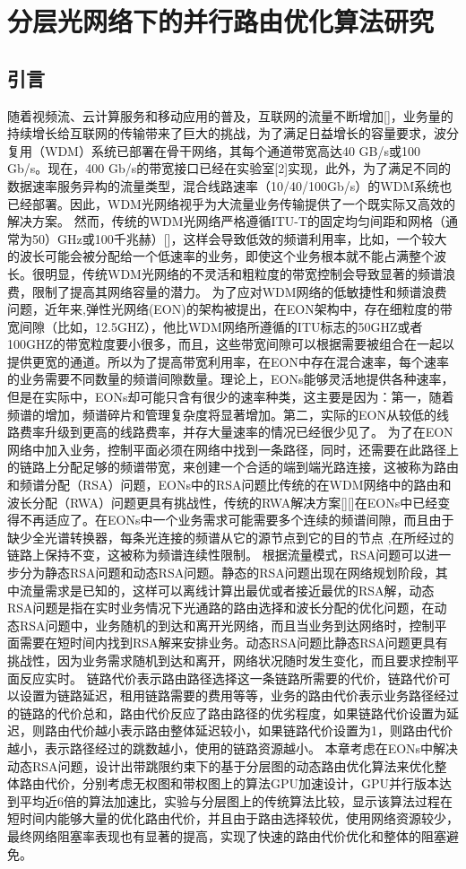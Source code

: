 
\chapter{分层光网络下的并行路由优化算法研究}
\section{引言}
  随着视频流、云计算服务和移动应用的普及，互联网的流量不断增加[]，业务量的持续增长给互联网的传输带来了巨大的挑战，为了满足日益增长的容量要求，波分复用（WDM）系统已部署在骨干网络，其每个通道带宽高达40 GB/s或100 Gb/s。现在，400 Gb/s的带宽接口已经在实验室[2]实现，此外，为了满足不同的数据速率服务异构的流量类型，混合线路速率（10/40/100Gb/s）的WDM系统也已经部署。因此，WDM光网络视乎为大流量业务传输提供了一个既实际又高效的解决方案。
  然而，传统的WDM光网络严格遵循ITU-T的固定均匀间距和网格（通常为50）GHz或100千兆赫）[]，这样会导致低效的频谱利用率，比如，一个较大的波长可能会被分配给一个低速率的业务，即使这个业务根本就不能占满整个波长。很明显，传统WDM光网络的不灵活和粗粒度的带宽控制会导致显著的频谱浪费，限制了提高其网络容量的潜力。
  为了应对WDM网络的低敏捷性和频谱浪费问题，近年来,弹性光网络(EON)的架构被提出，在EON架构中，存在细粒度的带宽间隙（比如，12.5GHZ），他比WDM网络所遵循的ITU标志的50GHZ或者100GHZ的带宽粒度要小很多，而且，这些带宽间隙可以根据需要被组合在一起以提供更宽的通道。所以为了提高带宽利用率，在EON中存在混合速率，每个速率的业务需要不同数量的频谱间隙数量。理论上，EONs能够灵活地提供各种速率，但是在实际中，EONs却可能只含有很少的速率种类，这主要是因为：第一，随着频谱的增加，频谱碎片和管理复杂度将显著增加。第二，实际的EON从较低的线路费率升级到更高的线路费率，并存大量速率的情况已经很少见了。
  为了在EON网络中加入业务，控制平面必须在网络中找到一条路径，同时，还需要在此路径上的链路上分配足够的频谱带宽，来创建一个合适的端到端光路连接，这被称为路由和频谱分配（RSA）问题，EONs中的RSA问题比传统的在WDM网络中的路由和波长分配（RWA）问题更具有挑战性，传统的RWA解决方案[][]在EONs中已经变得不再适应了。在EONs中一个业务需求可能需要多个连续的频谱间隙，而且由于缺少全光谱转换器，每条光连接的频谱从它的源节点到它的目的节点 ,在所经过的链路上保持不变，这被称为频谱连续性限制。
  根据流量模式，RSA问题可以进一步分为静态RSA问题和动态RSA问题。静态的RSA问题出现在网络规划阶段，其中流量需求是已知的，这样可以离线计算出最优或者接近最优的RSA解，动态RSA问题是指在实时业务情况下光通路的路由选择和波长分配的优化问题，在动态RSA问题中，业务随机的到达和离开光网络，而且当业务到达网络时，控制平面需要在短时间内找到RSA解来安排业务。动态RSA问题比静态RSA问题更具有挑战性，因为业务需求随机到达和离开，网络状况随时发生变化，而且要求控制平面反应实时。
 链路代价表示路由路径选择这一条链路所需要的代价，链路代价可以设置为链路延迟，租用链路需要的费用等等，业务的路由代价表示业务路径经过的链路的代价总和，路由代价反应了路由路径的优劣程度，如果链路代价设置为延迟，则路由代价越小表示路由整体延迟较小，如果链路代价设置为1，则路由代价越小，表示路径经过的跳数越小，使用的链路资源越小。
 本章考虑在EONs中解决动态RSA问题，设计出带跳限约束下的基于分层图的动态路由优化算法来优化整体路由代价，分别考虑无权图和带权图上的算法GPU加速设计，GPU并行版本达到平均近6倍的算法加速比，实验与分层图上的传统算法比较，显示该算法过程在短时间内能够大量的优化路由代价，并且由于路由选择较优，使用网络资源较少，最终网络阻塞率表现也有显著的提高，实现了快速的路由代价优化和整体的阻塞避免。
